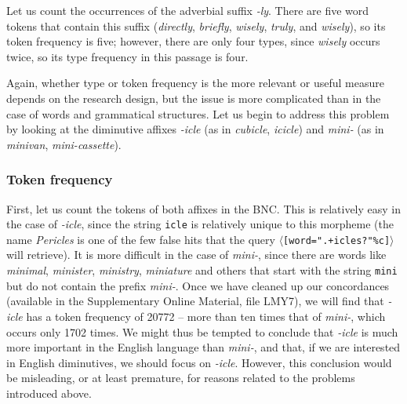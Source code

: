 Let us count the occurrences of the adverbial  suffix  \textit{-ly}. There are five word tokens  that contain this suffix  (\textit{directly}, \textit{briefly}, \textit{wisely}, \textit{truly}, and \textit{wisely}), so its token frequency  is five; however, there are only four types,  since \textit{wisely} occurs twice, so its type frequency  in this passage is four.

Again, whether type  or token  frequency  is the more relevant or useful measure  depends on the research design,  but the issue is more complicated than in the case of words and grammatical  structures. Let us begin to address this problem by looking at the diminutive affixes  \textit{-icle} (as in \textit{cubicle}, \textit{icicle}) and \textit{mini-} (as in \textit{minivan}, \textit{mini\hyp{}cassette}).

\subsubsection{Token frequency} 
First, let us count the tokens  of both affixes  in the BNC.  This is relatively easy in the case of \textit{-icle}, since the string \texttt{icle} is relatively unique to this morpheme  (the name \textit{Pericles} is one of the few false hits that the query \mbox{$\langle$\texttt{[word=".+icles?"\%c]}$\rangle$} will retrieve).  It is more difficult in the case of \textit{mini-}, since there are words like \textit{minimal}, \textit{minister}, \textit{ministry}, \textit{miniature} and others that start with the string \texttt{mini} but do not contain the prefix  \textit{mini-}. Once we have cleaned up our concordances  (available in the Supplementary Online Material, file LMY7), we will find that \textit{-icle} has a token frequency  of \num{20772} -- more than ten times that of \textit{mini-}, which occurs only \num{1702} times. We might thus be tempted to conclude that \textit{-icle} is much more important in the English language than \mbox{\textit{mini-},} and that, if we are interested in English diminutives, we should focus on \textit{-icle}. However, this conclusion would be misleading, or at least premature, for reasons related to the problems introduced above.


